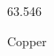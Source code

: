 \documentclass[12pt]{article}
\begin{document}
\hfill{}
\vfill
\begin{center}
  {\fontsize{50}{60}
  }

  63.546

Copper
\end{center}
\vfill
\end{document}
